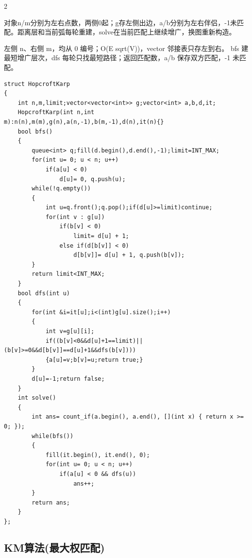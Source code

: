 \documentclass[UTF8,fontset=fandol,a4paper,twoside]{ctexart}
\newcommand{\note}[1]{{\fontsize{10}{12}\selectfont #1\par}}
\begin{document}
\begin{multicols}{2}
\note{对象n/\allowbreak{}m分别为左右点数，两侧0起；g存左侧出边，a/\allowbreak{}b分别为左右伴侣，-\allowbreak{}1未匹配。距离层和当前弧每轮重建，solve在当前匹配上继续增广，换图重新构造。}
\note{左侧 n、右侧 m，均从 0 编号；O(\allowbreak{}E sqrt(\allowbreak{}V)\allowbreak{})\allowbreak{}，vector 邻接表只存左到右。 bfs 建最短增广层次，dfs 每轮只找最短路径；返回匹配数，a/\allowbreak{}b 保存双方匹配，-\allowbreak{}1 未匹配。}
\begin{lstlisting}
struct HopcroftKarp
{
    int n,m,limit;vector<vector<int>> g;vector<int> a,b,d,it;
    HopcroftKarp(int n,int m):n(n),m(m),g(n),a(n,-1),b(m,-1),d(n),it(n){}
    bool bfs()
    {
        queue<int> q;fill(d.begin(),d.end(),-1);limit=INT_MAX;
        for(int u= 0; u < n; u++)
            if(a[u] < 0)
                d[u]= 0, q.push(u);
        while(!q.empty())
        {
            int u=q.front();q.pop();if(d[u]>=limit)continue;
            for(int v : g[u])
                if(b[v] < 0)
                    limit= d[u] + 1;
                else if(d[b[v]] < 0)
                    d[b[v]]= d[u] + 1, q.push(b[v]);
        }
        return limit<INT_MAX;
    }
    bool dfs(int u)
    {
        for(int &i=it[u];i<(int)g[u].size();i++)
        {
            int v=g[u][i];
            if((b[v]<0&&d[u]+1==limit)||(b[v]>=0&&d[b[v]]==d[u]+1&&dfs(b[v])))
            {a[u]=v;b[v]=u;return true;}
        }
        d[u]=-1;return false;
    }
    int solve()
    {
        int ans= count_if(a.begin(), a.end(), [](int x) { return x >= 0; });
        while(bfs())
        {
            fill(it.begin(), it.end(), 0);
            for(int u= 0; u < n; u++)
                if(a[u] < 0 && dfs(u))
                    ans++;
        }
        return ans;
    }
};
\end{lstlisting}
\subsection{KM算法(最大权匹配)}


\end{multicols}
\end{document}
